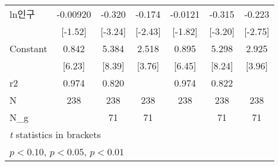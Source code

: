 \begin{tabular}{l*{6}{c}}
\addlinespace
ln인구            &    -0.00920         &      -0.320\sym{***}&      -0.174\sym{**} &     -0.0121\sym{*}  &      -0.315\sym{***}&      -0.223\sym{***}\\
                    &     [-1.52]         &     [-3.24]         &     [-2.43]         &     [-1.82]         &     [-3.20]         &     [-2.75]         \\
\addlinespace
Constant            &       0.842\sym{***}&       5.384\sym{***}&       2.518\sym{***}&       0.895\sym{***}&       5.298\sym{***}&       2.925\sym{***}\\
                    &      [6.23]         &      [8.39]         &      [3.76]         &      [6.45]         &      [8.24]         &      [3.96]         \\
\midrule
r2                  &       0.974         &       0.820         &                     &       0.974         &       0.822         &                     \\
N                   &         238         &         238         &         238         &         238         &         238         &         238         \\
N\_g                 &                     &          71         &          71         &                     &          71         &          71         \\
\bottomrule
\multicolumn{7}{l}{\footnotesize \textit{t} statistics in brackets}\\
\multicolumn{7}{l}{\footnotesize \sym{*} \(p<0.10\), \sym{**} \(p<0.05\), \sym{***} \(p<0.01\)}\\
\end{tabular}